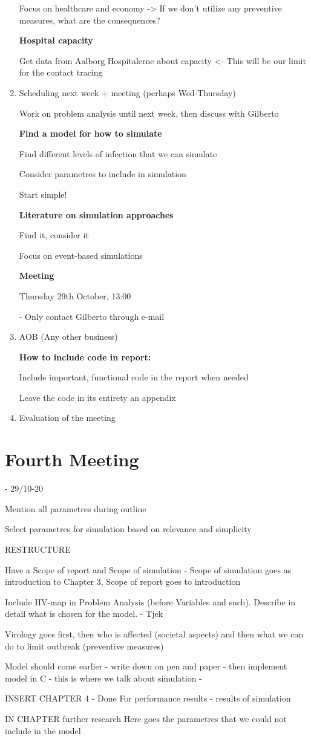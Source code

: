 \begin{enumerate}
Focus on healthcare and economy
-> If we don't utilize any preventive measures, what are the consequences?

\textbf{Hospital capacity}

Get data from Aalborg Hospitalerne about capacity <- This will be our limit for the contact tracing

\item Scheduling next week + meeting (perhaps Wed-Thursday) 

Work on problem analysis until next week, then discuss with Gilberto

\textbf{Find a model for how to simulate}

Find different levels of infection that we can simulate

Consider parametres to include in simulation

Start simple!

\textbf{Literature on simulation approaches}

Find it, consider it

Focus on event-based simulations

\textbf{Meeting}

Thursday 29th October, 13:00

- Only contact Gilberto through e-mail

\item AOB (Any other business) 

\textbf{How to include code in report:}

Include important, functional code in the report when needed

Leave the code in its entirety an appendix

\item Evaluation of the meeting 
\end{enumerate}

\section{Fourth Meeting} - 29/10-20

Mention all parametres during outline 

Select parametres for simulation based on relevance and simplicity

RESTRUCTURE

Have a Scope of report and Scope of simulation - Scope of simulation goes as introduction to Chapter 3, Scope of report goes to introduction

Include HV-map in Problem Analysis (before Variables and such). Describe in detail what is chosen for the model. - Tjek

Virology goes first, then who is affected (societal aspects) and then what we can do to limit outbreak (preventive measures)

Model should come earlier - write down on pen and paper - then implement model in C - this is where we talk about simulation - 

INSERT CHAPTER 4 - Done
For performance results - results of simulation

IN CHAPTER further research
Here goes the parametres that we could not include in the model